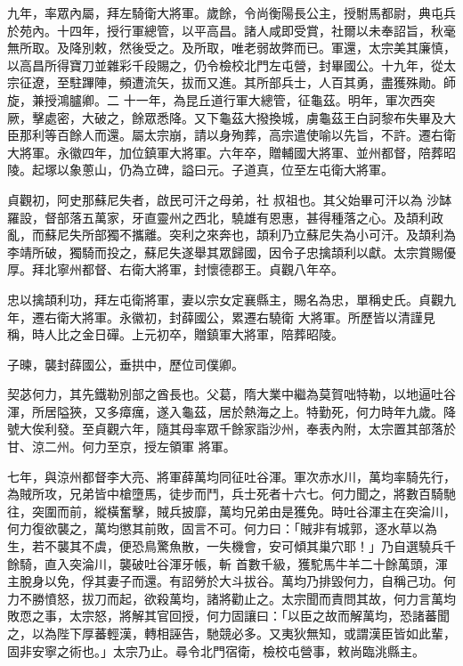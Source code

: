 \begin{pinyinscope}
 九年，率眾內屬，拜左騎衛大將軍。歲餘，令尚衡陽長公主，授駙馬都尉，典屯兵於苑內。十四年，授行軍總管，以平高昌。諸人咸即受賞，社爾以未奉詔旨，秋毫無所取。及降別敕，然後受之。及所取，唯老弱故弊而已。軍還，太宗美其廉慎，以高昌所得寶刀並雜彩千段賜之，仍令檢校北門左屯營，封畢國公。十九年，從太宗征遼，至駐蹕陣，頻遭流矢，拔而又進。其所部兵士，人百其勇，盡獲殊勛。師旋，兼授鴻臚卿。二
 十一年，為昆丘道行軍大總管，征龜茲。明年，軍次西突厥，擊處密，大破之，餘眾悉降。又下龜茲大撥換城，虜龜茲王白訶黎布失畢及大臣那利等百餘人而還。屬太宗崩，請以身殉葬，高宗遣使喻以先旨，不許。遷右衛大將軍。永徽四年，加位鎮軍大將軍。六年卒，贈輔國大將軍、並州都督，陪葬昭陵。起塚以象蔥山，仍為立碑，謚曰元。子道真，位至左屯衛大將軍。


貞觀初，阿史那蘇尼失者，啟民可汗之母弟，社
 叔祖也。其父始畢可汗以為
 沙缽羅設，督部落五萬家，牙直靈州之西北，驍雄有恩惠，甚得種落之心。及頡利政亂，而蘇尼失所部獨不攜離。突利之來奔也，頡利乃立蘇尼失為小可汗。及頡利為李靖所破，獨騎而投之，蘇尼失遂舉其眾歸國，因令子忠擒頡利以獻。太宗賞賜優厚。拜北寧州都督、右衛大將軍，封懷德郡王。貞觀八年卒。



 忠以擒頡利功，拜左屯衛將軍，妻以宗女定襄縣主，賜名為忠，單稱史氏。貞觀九年，遷右衛大將軍。永徽初，封薛國公，累遷右驍衛
 大將軍。所歷皆以清謹見稱，時人比之金日磾。上元初卒，贈鎮軍大將軍，陪葬昭陵。



 子暕，襲封薛國公，垂拱中，歷位司僕卿。



 契苾何力，其先鐵勒別部之酋長也。父葛，隋大業中繼為莫賀咄特勒，以地逼吐谷渾，所居隘狹，又多瘴癘，遂入龜茲，居於熱海之上。特勤死，何力時年九歲。降號大俟利發。至貞觀六年，隨其母率眾千餘家詣沙州，奉表內附，太宗置其部落於甘、涼二州。何力至京，授左領軍
 將軍。



 七年，與涼州都督李大亮、將軍薛萬均同征吐谷渾。軍次赤水川，萬均率騎先行，為賊所攻，兄弟皆中槍墮馬，徒步而鬥，兵士死者十六七。何力聞之，將數百騎馳往，突圍而前，縱橫奮擊，賊兵披靡，萬均兄弟由是獲免。時吐谷渾主在突淪川，何力復欲襲之，萬均懲其前敗，固言不可。何力曰：「賊非有城郭，逐水草以為生，若不襲其不虞，便恐鳥驚魚散，一失機會，安可傾其巢穴耶！」乃自選驍兵千餘騎，直入突淪川，襲破吐谷渾牙帳，斬
 首數千級，獲駝馬牛羊二十餘萬頭，渾主脫身以免，俘其妻子而還。有詔勞於大斗拔谷。萬均乃排毀何力，自稱己功。何力不勝憤怒，拔刀而起，欲殺萬均，諸將勸止之。太宗聞而責問其故，何力言萬均敗恧之事，太宗怒，將解其官回授，何力固讓曰：「以臣之故而解萬均，恐諸蕃聞之，以為陛下厚蕃輕漢，轉相誣告，馳競必多。又夷狄無知，或謂漢臣皆如此輩，固非安寧之術也。」太宗乃止。尋令北門宿衛，檢校屯營事，敕尚臨洮縣主。




\end{pinyinscope}
